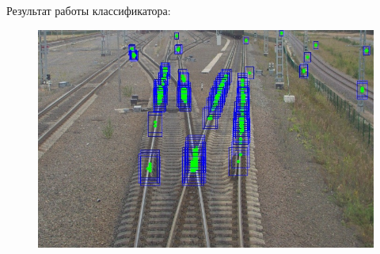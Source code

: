 Результат работы классификатора:
\begin{figure}[!h]
	\centering
	\includegraphics[width=0.7\linewidth]{pictures/screenshot2324}
	\caption{}
	\label{fig:screenshot2324}
\end{figure}

